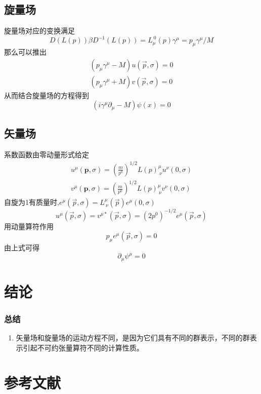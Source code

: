 \documentclass[aspectratio=1610,12pt]{beamer}
\begin{document}
\subsection{旋量场}
\begin{frame}
    旋量场对应的变换满足
    \begin{equation}
        D(L(p))\beta D^{-1}(L(p))=L^{\ 0}_\mu(p)\gamma^\mu=p_\mu\gamma^\mu/M
    \end{equation}
    那么可以推出
    \begin{align}
        (p_\mu\gamma^\mu-M)u(\vec{p},\sigma)=0\\
        (p_\mu\gamma^\mu+M)v(\vec{p},\sigma)=0
    \end{align}
    从而结合旋量场的方程得到
    \begin{equation}
        (i\gamma^\mu\partial_\mu-M)\psi(x)=0
    \end{equation}
\end{frame}
\subsection{矢量场}
\begin{frame}
    系数函数由零动量形式给定\cite{weinberg}
    \begin{align}
        u^\mu(\mathbf{p},\sigma)=(\frac{m}{p^0})^{1/2}L(p)^\mu_{\ \nu}u^\nu(0,\sigma)\\
        v^\mu(\mathbf{p},\sigma)=(\frac{m}{p^0})^{1/2}L(p)^\mu_{\ \nu}v^\nu(0,\sigma)
    \end{align}
    自旋为1有质量时,$e^\mu(\vec{p},\sigma)=L^\mu_{\ \nu}(\vec{p})e^\mu(0,\sigma)$
    \begin{equation}
        u^\mu(\vec{p},\sigma)=v^{\mu*}(\vec{p},\sigma)=(2p^0)^{-1/2}e^\mu(\vec{p},\sigma)
    \end{equation}
    用动量算符作用
    \begin{equation}
        p_\mu e^\mu(\vec{p},\sigma)=0
    \end{equation}
    由上式可得
    \begin{equation}
        \partial_\mu\psi^\mu=0
    \end{equation}
\end{frame}
\section{结论}
\begin{frame}
    \frametitle{总结}
    \begin{enumerate}
        \item 矢量场和旋量场的运动方程不同，是因为它们具有不同的群表示，不同的群表示引起不可约张量算符不同的计算性质。
    \end{enumerate}
\end{frame}
\section{参考文献}
\begin{frame}
    
\end{frame}
\end{document}
